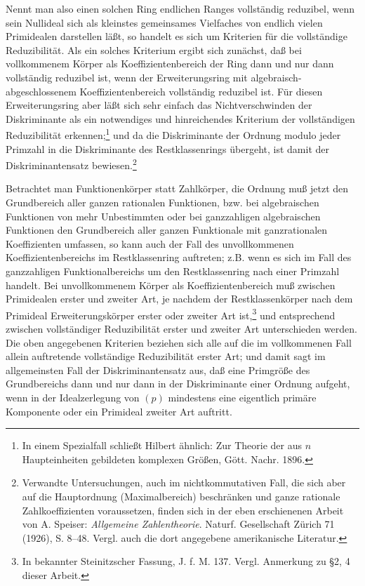 \documentclass[11pt]{article}
\begin{document}
Nennt man also einen solchen Ring endlichen Ranges vollständig reduzibel, wenn sein Nullideal sich als kleinstes gemeinsames Vielfaches von endlich vielen Primidealen darstellen läßt, so handelt es sich um Kriterien für die vollständige Reduzibilität. Als ein solches Kriterium ergibt sich zunächst, daß bei vollkommenem Körper als Koeffizientenbereich der Ring dann und nur dann vollständig reduzibel ist, wenn der Erweiterungsring mit algebraisch-abgeschlossenem Koeffizientenbereich vollständig reduzibel ist. Für diesen Erweiterungsring aber läßt sich sehr einfach das Nichtverschwinden der Diskriminante als ein notwendiges und hinreichendes Kriterium der vollständigen Reduzibilität erkennen;\footnote{In einem Spezialfall schließt Hilbert ähnlich: Zur Theorie der aus $n$ Haupteinheiten gebildeten komplexen Größen, Gött. Nachr. 1896.} und da die Diskriminante der Ordnung modulo jeder Primzahl in die Diskriminante des Restklassenrings übergeht, ist damit der Diskriminantensatz bewiesen.\footnote{Verwandte Untersuchungen, auch im nichtkommutativen Fall, die sich aber auf die Hauptordnung (Maximalbereich) beschränken und ganze rationale Zahlkoeffizienten voraussetzen, finden sich in der eben erschienenen Arbeit von A. Speiser: \emph{Allgemeine Zahlentheorie}. Naturf. Gesellschaft Zürich 71 (1926), S. 8--48. Vergl. auch die dort angegebene amerikanische Literatur.}

Betrachtet man Funktionenkörper statt Zahlkörper, die Ordnung muß jetzt den Grundbereich aller ganzen rationalen Funktionen, bzw. bei algebraischen Funktionen von mehr Unbestimmten oder bei ganzzahligen algebraischen Funktionen den Grundbereich aller ganzen Funktionale mit ganzrationalen Koeffizienten umfassen, so kann auch der Fall des unvollkommenen Koeffizientenbereichs im Restklassenring auftreten; z.B. wenn es sich im Fall des ganzzahligen Funktionalbereichs um den Restklassenring nach einer Primzahl handelt. Bei unvollkommenem Körper als Koeffizientenbereich muß zwischen Primidealen erster und zweiter Art, je nachdem der Restklassenkörper nach dem Primideal Erweiterungskörper erster oder zweiter Art ist,\footnote{In bekannter Steinitzscher Fassung, J. f. M. 137. Vergl. Anmerkung zu \S 2, 4 dieser Arbeit.} und entsprechend zwischen vollständiger Reduzibilität erster und zweiter Art unterschieden werden. Die oben angegebenen Kriterien beziehen sich alle auf die im vollkommenen Fall allein auftretende vollständige Reduzibilität erster Art; und damit sagt im allgemeinsten Fall der Diskriminantensatz aus, daß eine Primgröße des Grundbereichs dann und nur dann in der Diskriminante einer Ordnung aufgeht, wenn in der Idealzerlegung von $(p)$ mindestens eine eigentlich primäre Komponente oder ein Primideal zweiter Art auftritt.
\end{document}
